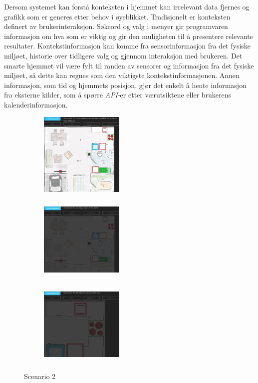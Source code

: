 Dersom systemet kan forstå konteksten i hjemmet kan irrelevant data fjernes og grafikk som er generes etter behov i øyeblikket. Tradisjonelt er konteksten definert av brukerinteraksjon. Søkeord og valg i menyer gir programvaren informasjon om hva som er viktig og gir den muligheten til å presentere relevante resultater. Kontekstinformasjon kan komme fra sensorinformasjon fra det fysiske miljøet, historie over tidligere valg og gjennom interaksjon med brukeren. Det smarte hjemmet vil være fylt til randen av sensorer og informasjon fra det fysiske miljøet, så dette kan regnes som den viktigste kontekstinformasjonen. Annen informasjon, som tid og hjemmets posisjon, gjør det enkelt å hente informasjon fra eksterne kilder, som å spørre \emph{API}-er etter værutsiktene eller brukerens kalenderinformasjon.
\begin{figure}[ht]
\centering
\begin{subfigure}{0.23\textwidth}
\includegraphics[width=4cm, height=4cm]{fig/scenario2a}
\caption{}
\label{fig:2a}
\end{subfigure}
\begin{subfigure}{0.23\textwidth}
\includegraphics[width=4cm, height=4cm]{fig/scenario2b}
\caption{}
\label{fig:2b}
\end{subfigure}
\begin{subfigure}{0.23\textwidth}
\includegraphics[width=4cm, height=4cm]{fig/scenario2c}
\caption{}
\label{fig:2c}
\end{subfigure}
\caption{Scenario 2}
\label{fig:scenario2}
\end{figure}
